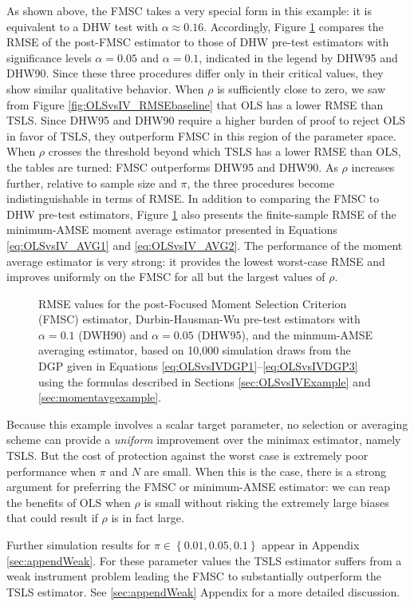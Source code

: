 As shown above, the FMSC takes a very special form in this example: it is equivalent to a DHW test with $\alpha \approx 0.16$.
Accordingly, Figure \ref{fig:OLSvsIV_AVG} compares the RMSE of the post-FMSC estimator to those of DHW pre-test estimators with significance levels $\alpha = 0.05$ and $\alpha = 0.1$, indicated in the legend by DHW95 and DHW90.
Since these three procedures differ only in their critical values, they show similar qualitative behavior.
When $\rho$ is sufficiently close to zero, we saw from Figure \ref{fig:OLSvsIV_RMSEbaseline} that OLS has a lower RMSE than TSLS.
Since DHW95 and DHW90 require a higher burden of proof to reject OLS in favor of TSLS, they outperform FMSC in this region of the parameter space.
When $\rho$ crosses the threshold beyond which TSLS has a lower RMSE than OLS, the tables are turned: FMSC outperforms DHW95 and DHW90.
As $\rho$ increases further, relative to sample size and $\pi$, the three procedures become indistinguishable in terms of RMSE.
In addition to comparing the FMSC to DHW pre-test estimators, Figure \ref{fig:OLSvsIV_AVG} also presents the finite-sample RMSE of the minimum-AMSE moment average estimator presented in Equations \ref{eq:OLSvsIV_AVG1} and \ref{eq:OLSvsIV_AVG2}.
The performance of the moment average estimator is very strong: it provides the lowest worst-case RMSE and improves uniformly on the FMSC for all but the largest values of $\rho$.


\begin{figure}
\centering
	
	\caption{RMSE values for the post-Focused Moment Selection Criterion (FMSC) estimator, Durbin-Hausman-Wu pre-test estimators with $\alpha = 0.1$ (DWH90) and $\alpha = 0.05$ (DHW95), and the minmum-AMSE averaging estimator, based on 10,000 simulation draws from the DGP given in Equations \ref{eq:OLSvsIVDGP1}--\ref{eq:OLSvsIVDGP3} using the formulas described in Sections \ref{sec:OLSvsIVExample} and \ref{sec:momentavgexample}.}
	\label{fig:OLSvsIV_AVG}
\end{figure}

Because this example involves a scalar target parameter, no selection or averaging scheme can provide a \emph{uniform} improvement over the minimax estimator, namely TSLS. 
But the cost of protection against the worst case is extremely poor performance when $\pi$ and $N$ are small.
When this is the case, there is a strong argument for preferring the FMSC or minimum-AMSE estimator: we can reap the benefits of OLS when $\rho$ is small without risking the extremely large biases that could result if $\rho$ is in fact large.

Further simulation results for $\pi \in \left\{ 0.01, 0.05, 0.1 \right\}$ appear in Appendix \ref{sec:appendWeak}.
For these parameter values the TSLS estimator suffers from a weak instrument problem leading the FMSC to substantially outperform the TSLS estimator.
See \ref{sec:appendWeak} Appendix for a more detailed discussion.
